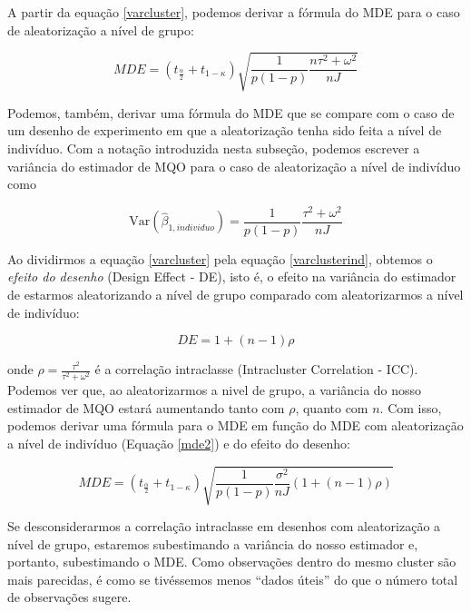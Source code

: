 A partir da equação \ref{varcluster}, podemos derivar a fórmula do MDE para o caso de aleatorização a nível de grupo:

\begin{equation}\label{mde4}
    MDE = (t_{\frac{\alpha}{2}} + t_{1-\kappa})\sqrt{\frac{1}{p(1-p)} \frac{n\tau^2 + \omega^2}{nJ}}
\end{equation}

Podemos, também, derivar uma fórmula do MDE que se compare com o caso de um desenho de experimento em que a aleatorização tenha sido feita a nível de indivíduo. Com a notação introduzida nesta subseção, podemos escrever a variância do estimador de MQO para o caso de aleatorização a nível de indivíduo como

\begin{equation}\label{varclusterind}
    \mathrm{Var}(\hat{\beta}_{1, individuo}) = \frac{1}{p(1-p)} \frac{\tau^2 + \omega^2}{nJ}
\end{equation}

Ao dividirmos a equação \ref{varcluster} pela equação \ref{varclusterind}, obtemos o \textit{efeito do desenho} (Design Effect - DE), isto é, o efeito na variância do estimador de estarmos aleatorizando a nível de grupo comparado com aleatorizarmos a nível de indivíduo:

\begin{equation}\label{designeffect}
    DE = 1 + (n-1)\rho
\end{equation}

\noindent onde $\rho = \frac{\tau^2}{\tau^2 + \omega^2}$ é a correlação intraclasse (Intracluster Correlation - ICC). Podemos ver que, ao aleatorizarmos a nivel de grupo, a variância do nosso estimador de MQO estará aumentando tanto com $\rho$, quanto com $n$. Com isso, podemos derivar uma fórmula para o MDE em função do MDE com aleatorização a nível de indivíduo (Equação \ref{mde2}) e do efeito do desenho:

\begin{equation}\label{mde5}
    MDE = (t_{\frac{\alpha}{2}} + t_{1-\kappa})\sqrt{\frac{1}{p(1-p)}\frac{\sigma^2}{nJ}(1 + (n-1)\rho)}
\end{equation}

Se desconsiderarmos a correlação intraclasse em desenhos com aleatorização a nível de grupo, estaremos subestimando a variância do nosso estimador e, portanto, subestimando o MDE. Como observações dentro do mesmo cluster são mais parecidas, é como se tivéssemos menos ``dados úteis'' do que o número total de observações sugere.

